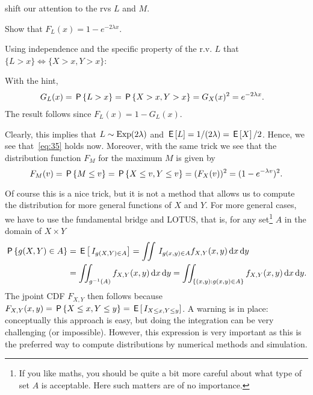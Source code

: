  shift our attention to the rvs $L$ and $M$.


\begin{exercise}
  Show that $F_L(x) = 1-e^{-2\lambda x}$.
\begin{hint}
Using independence and the specific property of the r.v. $L$ that $\{L>x\} \iff \{X>x, Y>x\}$:
\end{hint}
\begin{solution}
With the hint,
 \begin{align*}
G_L(x) = \P{L>x}  &= \P{X>x, Y> x} = G_X(x)^{2} = e^{-2\lambda x}.
  \end{align*}
The result follows since  $F_{L}(x) = 1-G_{L}(x)$.
\end{solution}
\end{exercise}

Clearly, this implies that  $L\sim \Exp{2\lambda}$ and $\E L = 1/(2\lambda) = \E X /2$. Hence, we see that~\cref{eq:35} holds now.
Moreover, with the same trick we see  that the distribution function $F_{M}$ for the maximum $M$ is given by
\begin{equation*}
F_{M}(v) = \P{M\leq v}   = \P{X \leq v, Y \leq v} = (F_{X}(v))^{2} = (1-e^{-\lambda v})^{2}.
\end{equation*}


Of course this is a nice trick, but it is not a method that allows us to compute the distribution for more general functions of $X$ and $Y$.
For more general cases, we have to use the fundamental bridge and LOTUS, that is,
for any set\footnote{If you like maths, you should be quite a bit more careful about what type of set $A$ is acceptable. Here such matters are of no importance.} $A$ in the domain of $X \times Y$
  \begin{equation*}
    \begin{split}
\P{g(X, Y) \in A}
&= \E{\1{g(X,Y)\in A}}
= \iint \1{g(x,y) \in A} f_{X,Y}(x,y) \d x \d y \\
&= \iint_{g^{-1}(A)} f_{X,Y}(x, y) \d x \d y
= \iint_{\{(x,y): g(x,y) \in A\}} f_{X,Y}(x,y) \d x \d y.
    \end{split}
  \end{equation*}
The jpoint CDF $F_{X,Y}$ then follows because $F_{X,Y}(x,y) = \P{X\leq x, Y\leq y} = \E{\1{X\leq x, Y\leq y}}$.
A warning is in place: conceptually this approach is easy, but doing  the integration can be very challenging (or impossible).  However, this expression is very important as this is the preferred way to compute distributions by numerical methods and simulation.



